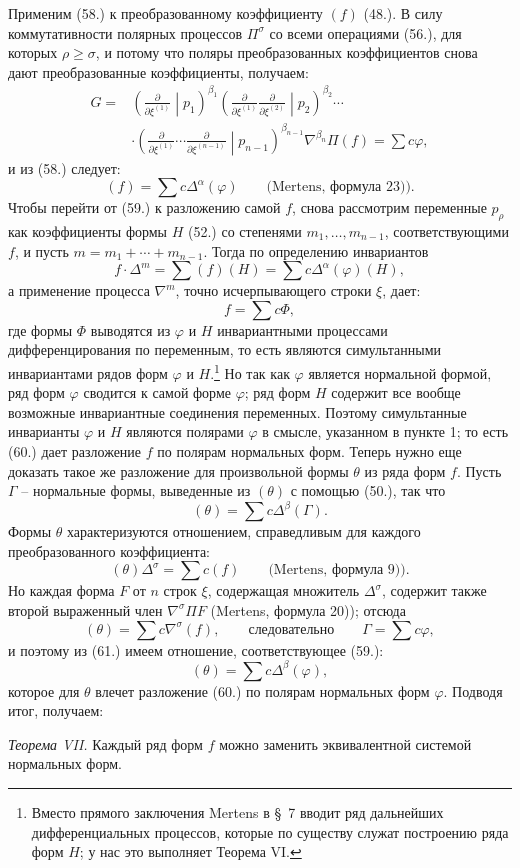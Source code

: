 \documentclass[11pt]{article}
\begin{document}
Применим (58.) к преобразованному коэффициенту $(f)$ (48.). В силу коммутативности полярных процессов $\Pi^\sigma$ со всеми операциями (56.), для которых $\rho\ge\sigma$, и потому что поляры преобразованных коэффициентов снова дают преобразованные коэффициенты, получаем:
\[
\begin{aligned}
G={}&\left(\frac{\partial}{\partial\xi^{(1)}}\middle|p_1\right)^{\beta_1}
\left(\frac{\partial}{\partial\xi^{(1)}}\frac{\partial}{\partial\xi^{(2)}}\middle|p_2\right)^{\beta_2}\cdots\\
&\cdot
\left(\frac{\partial}{\partial\xi^{(1)}}\cdots\frac{\partial}{\partial\xi^{(n-1)}}\middle|p_{n-1}\right)^{\beta_{n-1}}
\nabla^{\beta_n}\Pi(f)=\sum c\varphi,
\end{aligned}
\]
и из (58.) следует:
\begin{equation}
 (f)=\sum c\Delta^\alpha(\varphi)\qquad\text{(Mertens, формула 23)).}
\tag{59}
\end{equation}
Чтобы перейти от (59.) к разложению самой $f$, снова рассмотрим переменные $p_\rho$ как коэффициенты формы $H$ (52.) со степенями $m_1,\ldots,m_{n-1}$, соответствующими $f$, и пусть $m=m_1+\cdots+m_{n-1}$. Тогда по определению инвариантов
\[
 f\cdot\Delta^m=\sum(f)(H)=\sum c\Delta^\alpha(\varphi)(H),
\]
а применение процесса $\nabla^m$, точно исчерпывающего строки $\xi$, дает:
\begin{equation}
 f=\sum c\Phi,
\tag{60}
\end{equation}
где формы $\Phi$ выводятся из $\varphi$ и $H$ инвариантными процессами дифференцирования по переменным, то есть являются симультанными инвариантами рядов форм $\varphi$ и $H$.\footnote{Вместо прямого заключения Mertens в \S\ 7 вводит ряд дальнейших дифференциальных процессов, которые по существу служат построению ряда форм $H$; у нас это выполняет Теорема VI.} Но так как $\varphi$ является нормальной формой, ряд форм $\varphi$ сводится к самой форме $\varphi$; ряд форм $H$ содержит все вообще возможные инвариантные соединения переменных. Поэтому симультанные инварианты $\varphi$ и $H$ являются полярами $\varphi$ в смысле, указанном в пункте 1; то есть (60.) дает разложение $f$ по полярам нормальных форм. Теперь нужно еще доказать такое же разложение для произвольной формы $\theta$ из ряда форм $f$. Пусть $\Gamma$ -- нормальные формы, выведенные из $(\theta)$ с помощью (50.), так что
\begin{equation}
 (\theta)=\sum c\Delta^\beta(\Gamma).
\tag{61}
\end{equation}
Формы $\theta$ характеризуются отношением, справедливым для каждого преобразованного коэффициента:
\[
 (\theta)\Delta^\sigma=\sum c(f)\qquad\text{(Mertens, формула 9)).}
\]
Но каждая форма $F$ от $n$ строк $\xi$, содержащая множитель $\Delta^\sigma$, содержит также второй выраженный член $\nabla^\sigma\Pi F$ (Mertens, формула 20)); отсюда
\[
 (\theta)=\sum c\nabla^\sigma(f),\qquad\text{следовательно}\qquad \Gamma=\sum c\varphi,
\]
и поэтому из (61.) имеем отношение, соответствующее (59.):
\[
 (\theta)=\sum c\Delta^\beta(\varphi),
\]
которое для $\theta$ влечет разложение (60.) по полярам нормальных форм $\varphi$. Подводя итог, получаем:

\emph{Теорема VII.} Каждый ряд форм $f$ можно заменить эквивалентной системой нормальных форм.
\end{document}
